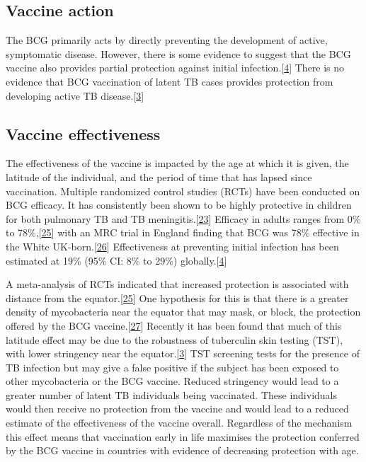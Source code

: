 \documentclass[11pt,twoside]{bristolthesis}
\begin{document}
  \hypertarget{vaccine-action}{%
  \subsection{Vaccine action}\label{vaccine-action}}
  
  The BCG primarily acts by directly preventing the development of active, symptomatic disease. However, there is some evidence to suggest that the BCG vaccine also provides partial protection against initial infection.{[}\protect\hyperlink{ref-Roy2014}{4}{]} There is no evidence that BCG vaccination of latent TB cases provides protection from developing active TB disease.{[}\protect\hyperlink{ref-TheWorldHealthOrganization:2018va}{3}{]}
  
  \hypertarget{vaccine-effectiveness}{%
  \subsection{Vaccine effectiveness}\label{vaccine-effectiveness}}
  
  The effectiveness of the vaccine is impacted by the age at which it is given, the latitude of the individual, and the period of time that has lapsed since vaccination. Multiple randomized control studies (RCTs) have been conducted on BCG efficacy. It has consistently been shown to be highly protective in children for both pulmonary TB and TB meningitis.{[}\protect\hyperlink{ref-Rodrigues1993}{23}{]} Efficacy in adults ranges from 0\% to 78\%,{[}\protect\hyperlink{ref-Mangtani2014a}{25}{]} with an MRC trial in England finding that BCG was 78\% effective in the White UK-born.{[}\protect\hyperlink{ref-Hart1972}{26}{]} Effectiveness at preventing initial infection has been estimated at 19\% (95\% CI: 8\% to 29\%) globally.{[}\protect\hyperlink{ref-Roy2014}{4}{]}
  
  A meta-analysis of RCTs indicated that increased protection is associated with distance from the equator.{[}\protect\hyperlink{ref-Mangtani2014a}{25}{]} One hypothesis for this is that there is a greater density of mycobacteria near the equator that may mask, or block, the protection offered by the BCG vaccine.{[}\protect\hyperlink{ref-Zwerling2011}{27}{]} Recently it has been found that much of this latitude effect may be due to the robustness of tuberculin skin testing (TST), with lower stringency near the equator.{[}\protect\hyperlink{ref-TheWorldHealthOrganization:2018va}{3}{]} TST screening tests for the presence of TB infection but may give a false positive if the subject has been exposed to other mycobacteria or the BCG vaccine. Reduced stringency would lead to a greater number of latent TB individuals being vaccinated. These individuals would then receive no protection from the vaccine and would lead to a reduced estimate of the effectiveness of the vaccine overall. Regardless of the mechanism this effect means that vaccination early in life maximises the protection conferred by the BCG vaccine in countries with evidence of decreasing protection with age.
  
\end{document}
